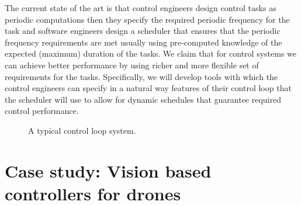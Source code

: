\documentclass[11pt]{article}
\begin{document}
The current state of the art is that control engineers design control tasks as periodic computations then they specify the required periodic frequency for the task and software engineers design a scheduler that ensures that the periodic frequency requirements are met usually using pre-computed knowledge of the expected (maximum) duration of the tasks.
We claim that for control systems we can achieve better performance by using richer and more flexible set of requirements for the tasks. Specifically, we will develop tools with which the control engineers can specify in a natural way features of their control loop that the scheduler will use to allow for dynamic schedules that guarantee required control performance. 

\begin{figure}[]
    \centering
    
    
    \caption{A typical control loop system.
    \label{fig:control loop}}
\end{figure}




\section{Case study: Vision based controllers for drones}
\label{sec:Case study}
\end{document}
